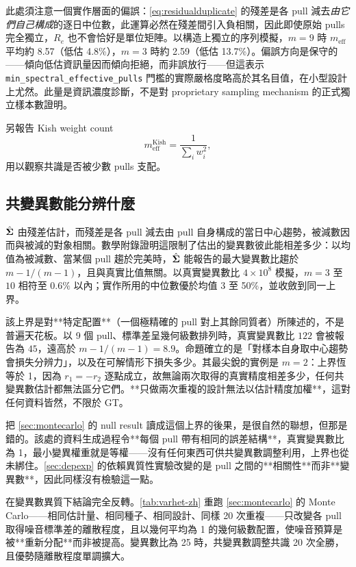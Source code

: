 \documentclass[12pt,a4paper,oneside]{article}
\begin{document}
此處須注意一個實作層面的偏誤：\cref{eq:residualduplicate} 的殘差是各 pull 減去\emph{由它們自己構成}的逐日中位數，此運算必然在殘差間引入負相關，因此即使原始 pulls 完全獨立，$R_e$ 也不會恰好是單位矩陣。以構造上獨立的序列模擬，$m=9$ 時 $m_{\mathrm{eff}}$ 平均約 8.57（低估 4.8\%），$m=3$ 時約 2.59（低估 13.7\%）。偏誤方向是保守的——傾向低估資訊量因而傾向拒絕，而非誤放行——但這表示 \texttt{min\_spectral\_effective\_pulls} 門檻的實際嚴格度略高於其名目值，在小型設計上尤然。此量是資訊濃度診斷，不是對 proprietary sampling mechanism 的正式獨立樣本數證明。

另報告 Kish weight count \cite{kish1965}
\begin{equation}
m_{\mathrm{eff}}^{\mathrm{Kish}}=\frac{1}{\sum_i w_i^2},
\end{equation}
用以觀察共識是否被少數 pulls 支配。

\subsection{共變異數能分辨什麼}\label{sec:resolution-zh}

$\hat{\bm{\Sigma}}$ 由殘差估計，而殘差是各 pull 減去由 pull 自身構成的當日中心趨勢，被減數因而與被減的對象相關。數學附錄證明這限制了估出的變異數彼此能相差多少：以均值為被減數、當某個 pull 趨於完美時，$\hat{\bm{\Sigma}}$ 能報告的最大變異數比趨於 $m-1/(m-1)$，且與真實比值無關。以真實變異數比 $4\times10^{8}$ 模擬，$m=3$ 至 $10$ 相符至 $0.6\%$ 以內；實作所用的中位數優於均值 3 至 50\%，並收斂到同一上界。

該上界是對**特定配置**（一個極精確的 pull 對上其餘同質者）所陳述的，不是普遍天花板。以 9 個 pull、標準差呈幾何級數排列時，真實變異數比 $122$ 會被報告為 $45$，遠高於 $m-1/(m-1)=8.9$。命題確立的是「對樣本自身取中心趨勢會損失分辨力」，以及在可解情形下損失多少。其最尖銳的實例是 $m=2$：上界恆等於 1，因為 $r_1=-r_2$ 逐點成立，故無論兩次取得的真實精度相差多少，任何共變異數估計都無法區分它們。**只做兩次重複的設計無法以估計精度加權**，這對任何資料皆然，不限於 GT。

把 \cref{sec:montecarlo} 的 null result 讀成這個上界的後果，是很自然的聯想，但那是錯的。該處的資料生成過程令**每個 pull 帶有相同的誤差結構**，真實變異數比為 1，最小變異權重就是等權——沒有任何東西可供共變異數調整利用，上界也從未綁住。\cref{sec:depexp} 的依賴異質性實驗改變的是 pull 之間的**相關性**而非**變異數**，因此同樣沒有檢驗這一點。

在變異數異質下結論完全反轉。\cref{tab:varhet-zh} 重跑 \cref{sec:montecarlo} 的 Monte Carlo——相同估計量、相同種子、相同設計、同樣 20 次重複——只改變各 pull 取得噪音標準差的離散程度，且以幾何平均為 1 的幾何級數配置，使噪音預算是被**重新分配**而非被提高。變異數比為 25 時，共變異數調整共識 20 次全勝，且優勢隨離散程度單調擴大。
\end{document}
